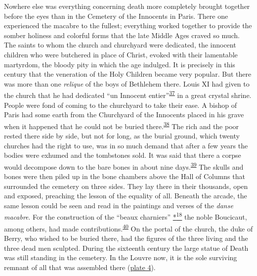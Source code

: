 Nowhere else was everything concerning death more completely brought
together before the eyes than in the Cemetery of the Innocents in Paris.
There one experienced the macabre to the fullest; everything worked
together to provide the somber holiness and colorful forms that the late
Middle Ages craved so much. The saints to whom the church and churchyard
were dedicated, the innocent children who were butchered in place of
Christ, evoked with their lamentable martyrdom, the bloody pity in which
the age indulged. It is precisely in this century that the veneration of
the Holy Children became very popular. But there was more than one
\emph{relique} of the boys of Bethlehem there. Louis XI had given to the
church
\protect\hypertarget{12_Chapter_Five__THE_VISION_OF_DEAT.xhtmlux5cux23page_170}{}{}that
he had dedicated ``un Innocent
entier''\textsuperscript{\protect\hypertarget{12_Chapter_Five__THE_VISION_OF_DEAT.xhtmlux5cux23id_1278}{\protect\hyperlink{23_NOTES.xhtmlux5cux23id_1279}{37}}}
in a great crystal shrine. People were fond of coming to the churchyard
to take their ease. A bishop of Paris had some earth from the Churchyard
of the Innocents placed in his grave when it happened that he could not
be buried
there.\textsuperscript{\protect\hypertarget{12_Chapter_Five__THE_VISION_OF_DEAT.xhtmlux5cux23id_1276}{\protect\hyperlink{23_NOTES.xhtmlux5cux23id_1277}{38}}}
The rich and the poor rested there side by side, but not for long, as
the burial ground, which twenty churches had the right to use, was in so
much demand that after a few years the bodies were exhumed and the
tombstones sold. It was said that there a corpse would decompose down to
the bare bones in about nine
days.\textsuperscript{\protect\hypertarget{12_Chapter_Five__THE_VISION_OF_DEAT.xhtmlux5cux23id_1274}{\protect\hyperlink{23_NOTES.xhtmlux5cux23id_1275}{39}}}
The skulls and bones were then piled up in the bone chambers above the
Hall of Columns that surrounded the cemetery on three sides. They lay
there in their thousands, open and exposed, preaching the lesson of the
equality of all. Beneath the arcade, the same lesson could be seen and
read in the paintings and verses of the \emph{danse macabre}. For the
construction of the ``beaux charniers''
\protect\hypertarget{12_Chapter_Five__THE_VISION_OF_DEAT.xhtmlux5cux23id_2985}{\protect\hyperlink{23_NOTES.xhtmlux5cux23id_2986}{*\textsuperscript{18}}}
the noble Boucicaut, among others, had made
contributions.\textsuperscript{\protect\hypertarget{12_Chapter_Five__THE_VISION_OF_DEAT.xhtmlux5cux23id_41}{\protect\hyperlink{23_NOTES.xhtmlux5cux23id_42}{40}}}
On the portal of the church, the duke of Berry, who wished to be buried
there, had the figures of the three living and the three dead men
sculpted. During the sixteenth century the large statue of Death was
still standing in the cemetery. In the Louvre now, it is the sole
surviving remnant of all that was assembled there
(\protect\hyperlink{20_ILLUSTRATIONS_FOLLOW_PAGE.xhtmlux5cux23id_2297}{plate
4}).


